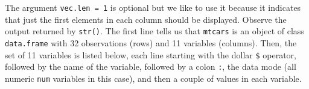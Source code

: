 \documentclass[
]{book}
\newenvironment{Shaded}{\begin{snugshade}}{\end{snugshade}}
\newcommand{\AttributeTok}[1]{\textcolor[rgb]{0.77,0.63,0.00}{#1}}
\newcommand{\DecValTok}[1]{\textcolor[rgb]{0.00,0.00,0.81}{#1}}
\newcommand{\ErrorTok}[1]{\textcolor[rgb]{0.64,0.00,0.00}{\textbf{#1}}}
\newcommand{\FloatTok}[1]{\textcolor[rgb]{0.00,0.00,0.81}{#1}}
\newcommand{\FunctionTok}[1]{\textcolor[rgb]{0.00,0.00,0.00}{#1}}
\newcommand{\NormalTok}[1]{#1}
\newcommand{\SpecialCharTok}[1]{\textcolor[rgb]{0.00,0.00,0.00}{#1}}
\newcommand{\StringTok}[1]{\textcolor[rgb]{0.31,0.60,0.02}{#1}}
\begin{document}
\begin{Shaded}
\end{Shaded}

The argument \texttt{vec.len\ =\ 1} is optional but we like to use it because it
indicates that just the first elements in each column should be displayed.
Observe the output returned by \texttt{str()}. The first line tells us that \texttt{mtcars}
is an object of class \texttt{\textquotesingle{}data.frame\textquotesingle{}} with 32 observations (rows) and 11 variables
(columns). Then, the set of 11 variables is listed below, each line starting
with the dollar \texttt{\$} operator, followed by the name of the variable, followed
by a colon \texttt{:}, the data mode (all numeric \texttt{num} variables in this case),
and then a couple of values in each variable.
\end{document}
